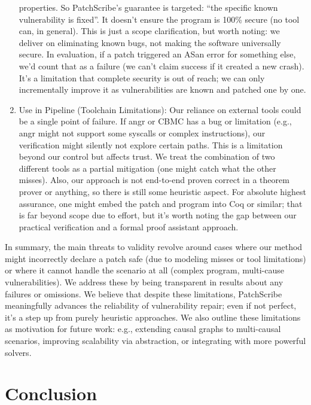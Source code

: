 \documentclass[conference,compsoc]{IEEEtran}
\begin{document}
\begin{enumerate}
  properties. So PatchScribe's guarantee is targeted: ``the specific
  known vulnerability is fixed''. It doesn't ensure the program is 100\%
  secure (no tool can, in general). This is just a scope clarification,
  but worth noting: we deliver on eliminating known bugs, not making the
  software universally secure. In evaluation, if a patch triggered an
  ASan error for something else, we'd count that as a failure (we can't
  claim success if it created a new crash). It's a limitation that
  complete security is out of reach; we can only incrementally improve
  it as vulnerabilities are known and patched one by one.
\item
  Use in Pipeline (Toolchain Limitations): Our reliance on external
  tools could be a single point of failure. If angr or CBMC has a bug or
  limitation (e.g., angr might not support some syscalls or complex
  instructions), our verification might silently not explore certain
  paths. This is a limitation beyond our control but affects trust. We
  treat the combination of two different tools as a partial mitigation
  (one might catch what the other misses). Also, our approach is not
  end-to-end proven correct in a theorem prover or anything, so there is
  still some heuristic aspect. For absolute highest assurance, one might
  embed the patch and program into Coq or similar; that is far beyond
  scope due to effort, but it's worth noting the gap between our
  practical verification and a formal proof assistant approach.
\end{enumerate}

In summary, the main threats to validity revolve around cases where our
method might incorrectly declare a patch safe (due to modeling misses or
tool limitations) or where it cannot handle the scenario at all (complex
program, multi-cause vulnerabilities). We address these by being
transparent in results about any failures or omissions. We believe that
despite these limitations, PatchScribe meaningfully advances the
reliability of vulnerability repair; even if not perfect, it's a step up
from purely heuristic approaches. We also outline these limitations as
motivation for future work: e.g., extending causal graphs to
multi-causal scenarios, improving scalability via abstraction, or
integrating with more powerful solvers.

\section{Conclusion}\label{conclusion}
\end{document}
